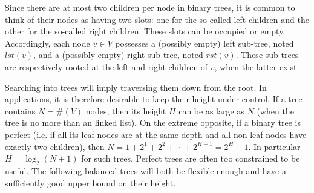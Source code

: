\documentclass[12pt]{article}
\theoremstyle{plain}
\theoremstyle{remark}
\begin{document}
Since there are at most two children per node in binary trees, it is common 
to think of their nodes as having two slots: one for the so-called left children and
the other for the so-called right children. These slots can be occupied or empty.
Accordingly, each node $v \in V$ possesses a (possibly empty) left sub-tree, 
noted $lst(v)$, and a (possibly empty) right sub-tree, noted $rst(v)$. These
sub-trees are respectively rooted at the left and right children of $v$, when 
the latter exist.

\medskip

Searching into trees will imply traversing them down from the root. In
applications, it is therefore desirable to keep their height under control. If a
tree contains $N = \#(V)$ nodes, then its height $H$ can be as large as $N$
(when the tree is no more than an linked list). On the extreme opposite, if a
binary tree is perfect (i.e. if all its leaf nodes are at the same depth and all non 
leaf nodes have exactly two children), then $N = 1 + 2^1 + 2^2 + \cdots + 2^{H -
1} = 2^H - 1.$ In particular $H = \log_2(N + 1)$ for such trees. Perfect trees are often too
constrained to be useful. The following balanced trees will both be flexible
enough and have a sufficiently good upper bound on their height.
\end{document}
